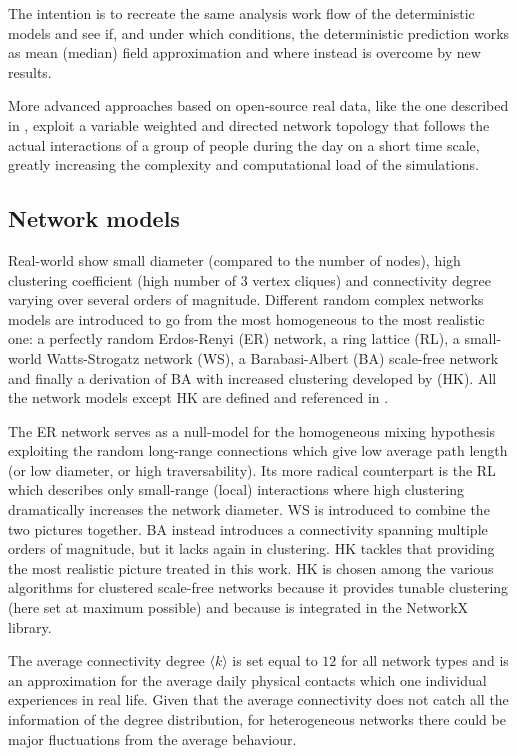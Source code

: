 \documentclass[DIV=12, BCOR=0pt]{scrartcl}  %
\begin{document}
	The intention is to recreate the same analysis work flow of the deterministic models and see if, and under which conditions, the deterministic prediction works as mean (median) field approximation and where instead is overcome by new results.
	
	More advanced approaches based on open-source real data, like the one described in \citet{Firth2020}, exploit a variable weighted and directed network topology that follows the actual interactions of a group of people during the day on a short time scale, greatly increasing the complexity and computational load of the simulations.
    
  \subsection{Network models}
  Real-world show small diameter (compared to the number of nodes), high clustering coefficient (high number of 3 vertex cliques) and connectivity degree varying over several orders of magnitude.
  Different random complex networks models are introduced to go from the most homogeneous to the most realistic one: a perfectly random Erdos-Renyi (ER) network, a ring lattice (RL), a small-world Watts-Strogatz network (WS), a Barabasi-Albert (BA) scale-free network and finally a derivation of BA with increased clustering developed by \citet{Holme} (HK). All the network models except HK are defined and referenced in \citet{PastorSatorras}.
  
  The ER network serves as a null-model for the homogeneous mixing hypothesis exploiting the random long-range connections which give low average path length (or low diameter, or high traversability). 
  Its more radical counterpart is the RL which describes only small-range (local) interactions where high clustering dramatically increases the network diameter. WS is introduced to combine the two pictures together. BA instead introduces a connectivity spanning multiple orders of magnitude, but it lacks again in clustering. HK tackles that providing the most realistic picture treated in this work. HK is chosen among the various algorithms for clustered scale-free networks because it provides tunable clustering (here set at maximum possible) and because is integrated in the NetworkX library.%
  
  The average connectivity degree $\langle k \rangle$ is set equal to $12$ for all network types and is an approximation for the average daily physical contacts which one individual experiences in real life. 
  Given that the average connectivity does not catch all the information of the degree distribution, for heterogeneous networks there could be major fluctuations from the average behaviour.
 	
  
\end{document}
